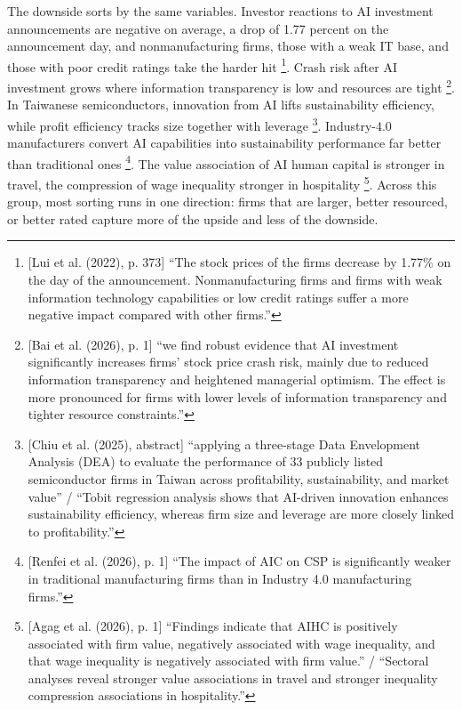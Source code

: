 The downside sorts by the same variables. Investor reactions to AI investment announcements are negative on average, a drop of 1.77 percent on the announcement day, and nonmanufacturing firms, those with a weak IT base, and those with poor credit ratings take the harder hit \parencite[p.~373]{lui2022impact}\footnote{[Lui et al. (2022), p. 373] ``The stock prices of the firms decrease by 1.77\% on the day of the announcement. Nonmanufacturing firms and firms with weak information technology capabilities or low credit ratings suffer a more negative impact compared with other firms.''}. Crash risk after AI investment grows where information transparency is low and resources are tight \parencite[p.~1]{bai2026artificial}\footnote{[Bai et al. (2026), p. 1] ``we find robust evidence that AI investment significantly increases firms' stock price crash risk, mainly due to reduced information transparency and heightened managerial optimism. The effect is more pronounced for firms with lower levels of information transparency and tighter resource constraints.''}. In Taiwanese semiconductors, innovation from AI lifts sustainability efficiency, while profit efficiency tracks size together with leverage \parencite[abstract]{chiu2025multi}\footnote{[Chiu et al. (2025), abstract] ``applying a three-stage Data Envelopment Analysis (DEA) to evaluate the performance of 33 publicly listed semiconductor firms in Taiwan across profitability, sustainability, and market value'' / ``Tobit regression analysis shows that AI-driven innovation enhances sustainability efficiency, whereas firm size and leverage are more closely linked to profitability.''}. Industry-4.0 manufacturers convert AI capabilities into sustainability performance far better than traditional ones \parencite[p.~1]{renfei2026exploring}\footnote{[Renfei et al. (2026), p. 1] ``The impact of AIC on CSP is significantly weaker in traditional manufacturing firms than in Industry 4.0 manufacturing firms.''}. The value association of AI human capital is stronger in travel, the compression of wage inequality stronger in hospitality \parencite[p.~1]{agag2026investing}\footnote{[Agag et al. (2026), p. 1] ``Findings indicate that AIHC is positively associated with firm value, negatively associated with wage inequality, and that wage inequality is negatively associated with firm value.'' / ``Sectoral analyses reveal stronger value associations in travel and stronger inequality compression associations in hospitality.''}. Across this group, most sorting runs in one direction: firms that are larger, better resourced, or better rated capture more of the upside and less of the downside.

